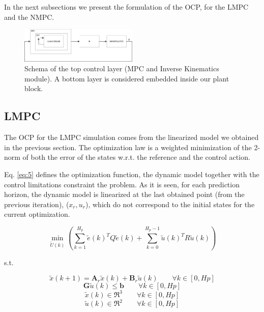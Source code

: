 \documentclass[conference]{IEEEtran}
\begin{document}
In the next subsections we present the formulation of the OCP, for the LMPC and the NMPC.

\begin{figure}[H]
\centering
\includegraphics[width=0.5\textwidth]{control_loop.png}
\caption{\label{fig:control}Schema of the top control layer (MPC and Inverse Kinematics module). A bottom layer is considered embedded inside our plant block.}
\end{figure}

\subsection{LMPC}\label{BA}

The OCP for the LMPC simulation comes from the linearized model we obtained in the previous section. The optimization law is a weighted minimization of the 2-norm of both the error of the states w.r.t. the reference and the control action.

Eq. \ref{eq:5} defines the optimization function, the dynamic model together with the control limitations constraint the problem. As it is seen, for each prediction horizon, the dynamic model is linearized at the last obtained point (from the previous iteration), ($x_{r},u_{r}$), which do not correspond to the initial states for the current optimization.

\begin{equation} \label{eq:5}
\min_{\tilde{U}(k)}\left(\sum_{k=1}^{H_{p}}\tilde{e}(k)^{T}Q \tilde{e}(k)+
\sum_{k=0}^{H_{p}-1}\tilde{u}(k)^{T}R\tilde{u}(k)\right)
\end{equation}

s.t.

\begin{equation*}
\tilde{x}(k+1) = \mathbf{A}_{r}\tilde{x}(k)+\mathbf{B}_{r}\tilde{u}(k) \qquad \forall k \in [0,Hp]
\end{equation*}
\begin{equation*}
\mathbf{G}\tilde{u}(k) \leq \mathbf{b} \qquad \forall k \in [0,Hp]
\end{equation*}
\begin{equation*}
\tilde{x}(k) \in \Re^{3} \qquad \forall k \in [0,Hp]
\end{equation*}
\begin{equation*}
\tilde{u}(k) \in \Re^{2} \qquad \forall k \in [0,Hp]
\end{equation*}
\end{document}
